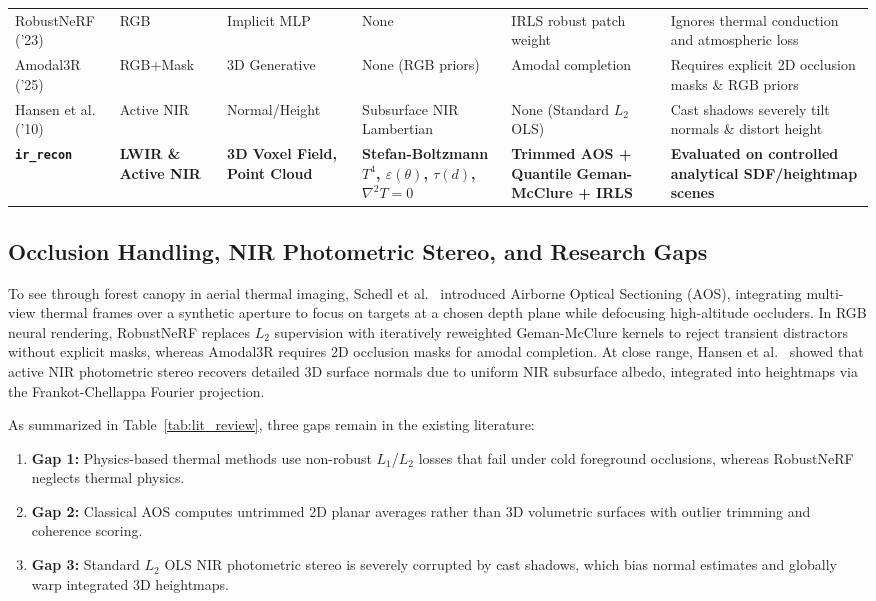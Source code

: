\documentclass[12pt,letterpaper]{article}
\begin{document}
\begin{table}[!htbp]
\begin{tabular}{p{2.7cm}p{1.5cm}p{2.0cm}p{2.6cm}p{2.4cm}p{4.1cm}}
    RobustNeRF \cite{sabour2023robustnerf} ('23) & RGB & Implicit MLP & None & IRLS robust patch weight & Ignores thermal conduction and atmospheric loss \\
    Amodal3R \cite{wu2025amodal3r} ('25) & RGB+Mask & 3D Generative & None (RGB priors) & Amodal completion & Requires explicit 2D occlusion masks \& RGB priors \\
    Hansen et al.\ \cite{hansen2010nir} ('10) & Active NIR & Normal/Height & Subsurface NIR Lambertian & None (Standard $L_2$ OLS) & Cast shadows severely tilt normals \& distort height \\
    \midrule
    \textbf{\texttt{ir\_recon}} & \textbf{LWIR \& Active NIR} & \textbf{3D Voxel Field, Point Cloud} & \textbf{Stefan-Boltzmann $T^4$, $\varepsilon(\theta)$, $\tau(d)$, $\nabla^2 T=0$} & \textbf{Trimmed AOS + Quantile Geman-McClure + IRLS} & \textbf{Evaluated on controlled analytical SDF/heightmap scenes} \\
    \bottomrule
  \end{tabular}
\end{table}

\subsection{Occlusion Handling, NIR Photometric Stereo, and Research Gaps}
To see through forest canopy in aerial thermal imaging, Schedl et al.\ \cite{schedl2020search} introduced Airborne Optical Sectioning (AOS), integrating multi-view thermal frames over a synthetic aperture to focus on targets at a chosen depth plane while defocusing high-altitude occluders. In RGB neural rendering, RobustNeRF \cite{sabour2023robustnerf} replaces $L_2$ supervision with iteratively reweighted Geman-McClure kernels to reject transient distractors without explicit masks, whereas Amodal3R \cite{wu2025amodal3r} requires 2D occlusion masks for amodal completion. At close range, Hansen et al.\ \cite{hansen2010nir} showed that active NIR photometric stereo recovers detailed 3D surface normals due to uniform NIR subsurface albedo, integrated into heightmaps via the Frankot-Chellappa Fourier projection.

As summarized in Table~\ref{tab:lit_review}, three gaps remain in the existing literature:
\begin{enumerate}
  \item \textbf{Gap 1:} Physics-based thermal methods \cite{ye2024thermalnerf,lin2024thermalnerf,chen2024thermal3dgs} use non-robust $L_1$/$L_2$ losses that fail under cold foreground occlusions, whereas RobustNeRF \cite{sabour2023robustnerf} neglects thermal physics.
  \item \textbf{Gap 2:} Classical AOS \cite{schedl2020search} computes untrimmed 2D planar averages rather than 3D volumetric surfaces with outlier trimming and coherence scoring.
  \item \textbf{Gap 3:} Standard $L_2$ OLS NIR photometric stereo \cite{hansen2010nir} is severely corrupted by cast shadows, which bias normal estimates and globally warp integrated 3D heightmaps.
\end{enumerate}
\end{document}
